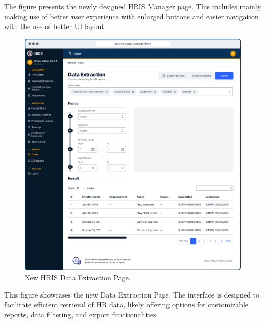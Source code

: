     The figure presents the newly designed HRIS Manager page. This includes mainly making use of better user experience with enlarged buttons and easier navigation with the use of better UI layout.

    \begin{figure}[H]
        \centering
        \includegraphics[width=1\linewidth]{figures/app/data-extraction.png}
        \caption{New HRIS Data Extraction Page.}
        \label{fig:app-data-extraction}
    \end{figure}

    This figure showcases the new Data Extraction Page. The interface is designed to facilitate efficient retrieval of HR data, likely offering options for customizable reports, data filtering, and export functionalities.

